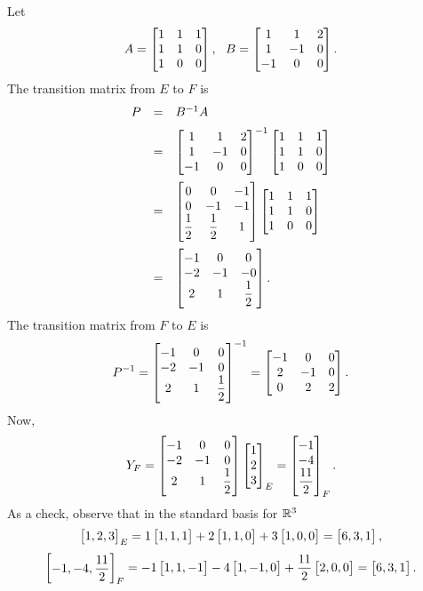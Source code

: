 \begin{solu}Let $$A = \begin{bmatrix} 1 & 1 & 1 \cr 1 & 1 & 0 \cr 1&
0 & 0 \cr
\end{bmatrix}, \ \ B = \begin{bmatrix} 1 & 1 & 2 \cr 1 & -1 & 0 \cr
-1 & 0 & 0 \cr
\end{bmatrix}.$$
The transition matrix from  ${E}$ to ${F}$
is
$$\begin{array}{lll}P & = & B^{-1}A \vspace{2mm}\\
& = &\begin{bmatrix} 1 & 1 & 2 \cr 1 & -1 & 0 \cr -1 & 0 & 0 \cr
\end{bmatrix}^{-1}\begin{bmatrix} 1 & 1 & 1 \cr 1 & 1 & 0 \cr 1&
0 & 0 \cr
\end{bmatrix}\vspace{2mm}\\ &  = &  \begin{bmatrix} 0 & 0 & -1 \cr 0 & -1 & -1 \cr \dfrac{1}{2} & \dfrac{1}{2} & 1 \cr \end{bmatrix}  \begin{bmatrix} 1 & 1 & 1 \cr 1 & 1 & 0 \cr 1&
0 & 0 \cr
\end{bmatrix} \vspace{2mm}\\ &  = &     \begin{bmatrix} -1 & 0 & 0 \cr -2 &  -1 & -0 \cr 2 & 1 & \dfrac{1}{2}  \end{bmatrix}.  \end{array}   $$
The transition matrix from  ${F}$ to ${E}$
is $$P^{-1} = \begin{bmatrix} -1 & 0 & 0 \cr -2 & -1 & 0  \cr 2 &
1 & \dfrac{1}{2}  \end{bmatrix}^{-1} = \begin{bmatrix} -1 & 0 & 0
\cr 2 & -1 & 0 \cr 0 & 2 & 2 \cr\end{bmatrix}.
$$Now,
$$  Y_{F} = \begin{bmatrix} -1 & 0 & 0 \cr -2 & -1 & 0  \cr 2 &
1 & \dfrac{1}{2}  \end{bmatrix}\begin{bmatrix} 1\\
2 \\ 3 \end{bmatrix}_{E}  = \begin{bmatrix} -1 \\ -4 \\
\dfrac{11}{2} \end{bmatrix}_{F}. $$ As a check, observe that in the
standard basis for $\mathbb{R}^3$
$$ \begin{bmatrix} 1,
2 , 3 \end{bmatrix}_{E}  = 1\begin{bmatrix} 1, 1, 1 \end{bmatrix} + 2\begin{bmatrix} 1, 1,
0  \end{bmatrix} + 3\begin{bmatrix} 1, 0 , 0 \end{bmatrix} = \begin{bmatrix} 6, 3 , 1 \end{bmatrix},
$$
$$ \begin{bmatrix} -1,
-4 , \dfrac{11}{2} \end{bmatrix}_{F}  = -1\begin{bmatrix} 1, 1, -1 \end{bmatrix}  - 4\begin{bmatrix} 1, -1,
0  \end{bmatrix} + \dfrac{11}{2}\begin{bmatrix} 2, 0 , 0 \end{bmatrix} = \begin{bmatrix} 6, 3 , 1 \end{bmatrix}.
$$
\end{solu}

